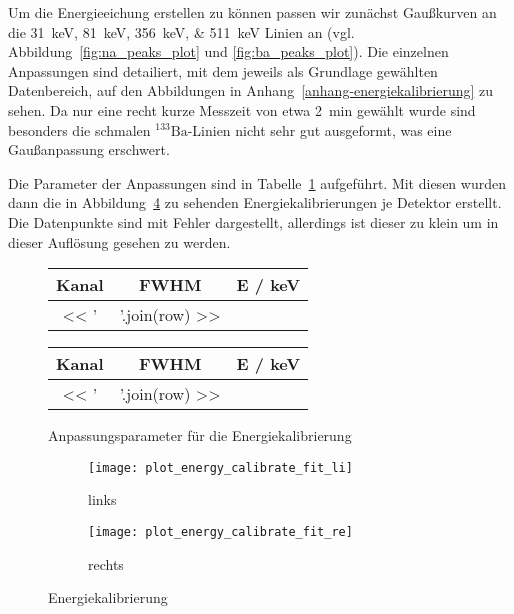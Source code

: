 \documentclass[11pt, ngerman, fleqn, DIV=15, headinclude, BCOR=2cm]{scrreprt}
\begin{document}
Um die Energieeichung erstellen zu können passen wir zunächst Gaußkurven an die
\SIlist{31;81;356;511}{\kilo\electronvolt} Linien an (vgl.
Abbildung~\ref{fig:na_peaks_plot} und \ref{fig:ba_peaks_plot}).
Die einzelnen Anpassungen sind detailiert, mit dem jeweils als Grundlage
gewählten Datenbereich, auf den Abbildungen in
Anhang~\ref{anhang-energiekalibrierung} zu sehen.
Da nur eine recht kurze Messzeit von etwa \SI{2}{\minute} gewählt wurde sind
besonders die schmalen $^{133}\text{Ba}$-Linien nicht sehr gut ausgeformt, was
eine Gaußanpassung erschwert.

Die Parameter der Anpassungen sind in Tabelle~\ref{tab:energiekalibrierung}
aufgeführt. Mit diesen wurden dann die in
Abbildung~\ref{fig:energiekalibrierung_plot} zu sehenden Energiekalibrierungen
je Detektor erstellt. Die Datenpunkte sind mit Fehler dargestellt, allerdings
ist dieser zu klein um in dieser Auflösung gesehen zu werden.

\begin{figure}[h]
    \begin{minipage}[t]{0.45\textwidth}
	\centering
	\begin{tabular}{SSS}
		{Kanal} &
		{FWHM} &
		{E / \si{\kilo\electronvolt}}\\
		\midrule
		<< ' & '.join(row) >> \\
	\end{tabular}
    \end{minipage}
    \hfill
    \begin{minipage}[t]{0.45\textwidth}
        \centering
        \begin{tabular}{SSS}
		{Kanal} &
		{FWHM} &
		{E / \si{\kilo\electronvolt}}\\
		\midrule
		<< ' & '.join(row) >> \\
	\end{tabular}
    \end{minipage}
	\caption{%
		Anpassungsparameter für die Energiekalibrierung
	}
	\label{tab:energiekalibrierung}
\end{figure}

\begin{figure}[h]
	\centering
	\begin{subfigure}{0.49 \textwidth}
		\texttt{[image: plot\_energy\_calibrate\_fit\_li]}
		\caption{%
			links
		}
		\label{fig:energiekalibrierung-li_plot}
	\end{subfigure}
	\begin{subfigure}{0.49 \textwidth}
		\texttt{[image: plot\_energy\_calibrate\_fit\_re]}
		\caption{%
			rechts
		}
		\label{fig:energiekalibrierung-re_plot}
	\end{subfigure}
	\caption{%
		Energiekalibrierung
	}
	\label{fig:energiekalibrierung_plot}
\end{figure}
\end{document}
